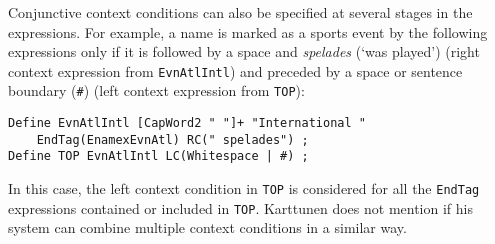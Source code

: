 \documentclass{llncs}
\begin{document}


Conjunctive context conditions can also be specified at several stages in the
expressions. For example, a name is marked as a sports event by the
following expressions only if it is followed by a space and
\textit{spelades} (`was played') (right context expression from
\texttt{EvnAtlIntl}) and preceded by a space or sentence boundary
(\texttt{\#}) (left context expression from \texttt{TOP}):

\begin{verbatim}
Define EvnAtlIntl [CapWord2 " "]+ "International "
    EndTag(EnamexEvnAtl) RC(" spelades") ;
Define TOP EvnAtlIntl LC(Whitespace | #) ;
\end{verbatim}

\noindent
In this case, the left context condition in \texttt{TOP} is considered
for all the \texttt{EndTag} expressions contained or included in
\texttt{TOP}. Karttunen \cite{karttunen/2011} does not mention if his
system can combine multiple context conditions in a similar way.


\end{document}
